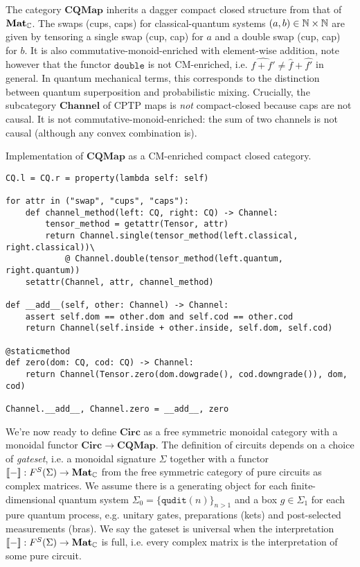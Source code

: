 The category $\mathbf{CQMap}$ inherits a dagger compact closed structure from that of $\mathbf{Mat}_{\mathbb{C}}$.
The swaps (cups, caps) for classical-quantum systems $(a, b) \in \mathbb{N} \times \mathbb{N}$ are given by tensoring a single swap (cup, cap) for $a$ and a double swap (cup, cap) for $b$.
It is also commutative-monoid-enriched with element-wise addition, note however that the functor $\mathtt{double}$ is not CM-enriched, i.e. $\widehat{f + f'} \neq \widehat{f} + \widehat{f'}$ in general.
In quantum mechanical terms, this corresponds to the distinction between
quantum superposition and probabilistic mixing.
Crucially, the subcategory $\mathbf{Channel}$ of CPTP maps is \emph{not} compact-closed because caps are not causal.
It is not commutative-monoid-enriched: the sum of two channels is not causal (although any convex combination is).

\begin{python}
{\normalfont Implementation of $\mathbf{CQMap}$ as a CM-enriched compact closed category.}

\begin{verbatim}
CQ.l = CQ.r = property(lambda self: self)

for attr in ("swap", "cups", "caps"):
    def channel_method(left: CQ, right: CQ) -> Channel:
        tensor_method = getattr(Tensor, attr)
        return Channel.single(tensor_method(left.classical, right.classical))\
            @ Channel.double(tensor_method(left.quantum, right.quantum))
    setattr(Channel, attr, channel_method)

def __add__(self, other: Channel) -> Channel:
    assert self.dom == other.dom and self.cod == other.cod
    return Channel(self.inside + other.inside, self.dom, self.cod)

@staticmethod
def zero(dom: CQ, cod: CQ) -> Channel:
    return Channel(Tensor.zero(dom.dowgrade(), cod.downgrade()), dom, cod)

Channel.__add__, Channel.zero = __add__, zero
\end{verbatim}
\end{python}

We're now ready to define $\mathbf{Circ}$ as a free symmetric monoidal category with a monoidal functor $\mathbf{Circ} \to \mathbf{CQMap}$.
The definition of circuits depends on a choice of \emph{gateset}, i.e. a monoidal signature $\Sigma$ together with a functor $[\![-]\!] : F^S(\Sigma) \to \mathbf{Mat}_{\mathbb{C}}$ from the free symmetric category of pure circuits as complex matrices.
We assume there is a generating object for each finite-dimensional quantum system $\Sigma_0 = \{ \mathtt{qudit}(n) \}_{n > 1}$ and a box $g \in \Sigma_1$ for each pure quantum process, e.g. unitary gates, preparations (kets) and post-selected measurements (bras).
We say the gateset is universal when the interpretation $[\![-]\!] : F^S(\Sigma) \to \mathbf{Mat}_{\mathbb{C}}$ is full, i.e. every complex matrix is the interpretation of some pure circuit.

